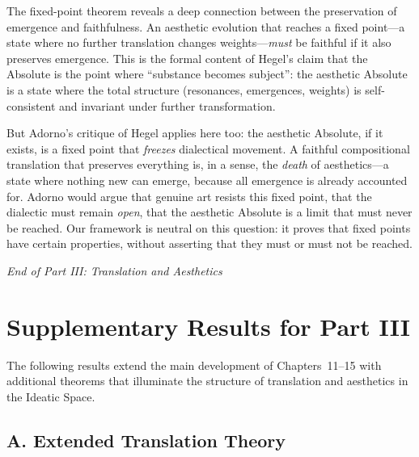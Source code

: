 \begin{interpretation}
\label{interp:aesthetic-absolute}
The fixed-point theorem reveals a deep connection between the preservation of emergence and faithfulness.  An aesthetic evolution that reaches a fixed point---a state where no further translation changes weights---\emph{must} be faithful if it also preserves emergence.  This is the formal content of Hegel's claim that the Absolute is the point where ``substance becomes subject'': the aesthetic Absolute is a state where the total structure (resonances, emergences, weights) is self-consistent and invariant under further transformation.

But Adorno's critique of Hegel applies here too: the aesthetic Absolute, if it exists, is a fixed point that \emph{freezes} dialectical movement.  A faithful compositional translation that preserves everything is, in a sense, the \emph{death} of aesthetics---a state where nothing new can emerge, because all emergence is already accounted for.  Adorno would argue that genuine art resists this fixed point, that the dialectic must remain \emph{open}, that the aesthetic Absolute is a limit that must never be reached.  Our framework is neutral on this question: it proves that fixed points have certain properties, without asserting that they must or must not be reached.
\end{interpretation}

\vspace{1em}
\begin{center}
\textit{End of Part III: Translation and Aesthetics}
\end{center}




\section*{Supplementary Results for Part III}

The following results extend the main development of Chapters~11--15
with additional theorems that illuminate the structure of translation
and aesthetics in the Ideatic Space.

\subsection*{A. Extended Translation Theory}

